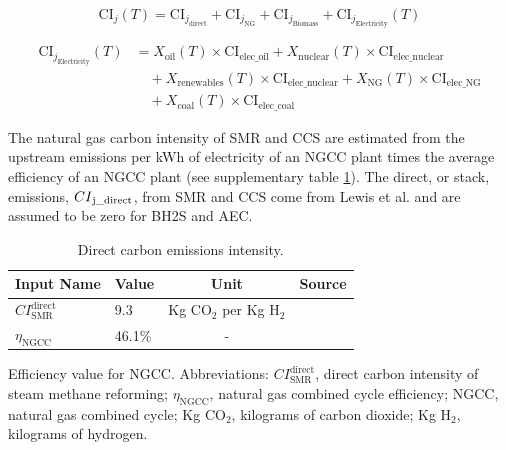 \documentclass{article}
\begin{document}
\begin{equation}
\text{CI}_j(T) = \text{CI}_{j_{\text{direct}}} + \text{CI}_{j_{\text{NG}}} + \text{CI}_{j_{\text{Biomass}}} + \text{CI}_{j_{\text{Electricity}}}(T)
\label{eq:S36}
\end{equation}

\begin{equation}
\begin{aligned}
\text{CI}_{j_{\text{Electricity}}}(T) &= X_{\text{oil}}(T) \times \text{CI}_{\text{elec\_oil}} + X_{\text{nuclear}}(T) \times \text{CI}_{\text{elec\_nuclear}} \\
&\quad + X_{\text{renewables}}(T) \times \text{CI}_{\text{elec\_nuclear}} + X_{\text{NG}}(T) \times \text{CI}_{\text{elec\_NG}} \\
&\quad + X_{\text{coal}}(T) \times \text{CI}_{\text{elec\_coal}}
\end{aligned}
\label{eq:S37}
\end{equation}

The natural gas carbon intensity of SMR and CCS are estimated from the upstream emissions per kWh of electricity of an NGCC plant times the average efficiency of an NGCC plant (see supplementary table \ref{table:carbon_emissions_intensity}). The direct, or stack, emissions, \( CI\textsubscript{j\_direct} \), from SMR and CCS come from Lewis et al.\cite{LEWIS2022} and are assumed to be zero for BH2S and AEC.

\begin{table}[H]
  \centering
  \caption{Direct carbon emissions intensity.}
  \label{table:carbon_emissions_intensity}
  \begin{threeparttable}
    \begin{tabular}{@{}lp{5cm}cp{2cm}@{}}
      \toprule
      \textbf{Input Name} & \textbf{Value} & \textbf{Unit} & \textbf{Source} \\ \midrule
      $CI_{\text{SMR}}^{\text{direct}}$ & 9.3 & Kg CO$_2$ per Kg H$_2$ & \cite{LEWIS2022} \\
      $\eta_{\text{NGCC}}$ & 46.1\% & - & \cite{DONO2014} \\ \bottomrule
    \end{tabular}
\begin{tablenotes}
  \small
  \item Efficiency value for NGCC. Abbreviations: $CI_{\text{SMR}}^{\text{direct}}$, direct carbon intensity of steam methane reforming; $\eta_{\text{NGCC}}$, natural gas combined cycle efficiency; NGCC, natural gas combined cycle; Kg CO$_2$, kilograms of carbon dioxide; Kg H$_2$, kilograms of hydrogen.
\end{tablenotes}

  \end{threeparttable}
\end{table}
\end{document}
